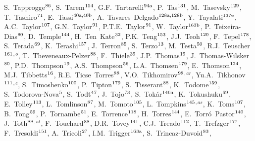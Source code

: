 \begin{flushleft}
S.~Tapprogge$^\textrm{\scriptsize 86}$,
S.~Tarem$^\textrm{\scriptsize 154}$,
G.F.~Tartarelli$^\textrm{\scriptsize 94a}$,
P.~Tas$^\textrm{\scriptsize 131}$,
M.~Tasevsky$^\textrm{\scriptsize 129}$,
T.~Tashiro$^\textrm{\scriptsize 71}$,
E.~Tassi$^\textrm{\scriptsize 40a,40b}$,
A.~Tavares~Delgado$^\textrm{\scriptsize 128a,128b}$,
Y.~Tayalati$^\textrm{\scriptsize 137e}$,
A.C.~Taylor$^\textrm{\scriptsize 107}$,
G.N.~Taylor$^\textrm{\scriptsize 91}$,
P.T.E.~Taylor$^\textrm{\scriptsize 91}$,
W.~Taylor$^\textrm{\scriptsize 163b}$,
P.~Teixeira-Dias$^\textrm{\scriptsize 80}$,
D.~Temple$^\textrm{\scriptsize 144}$,
H.~Ten~Kate$^\textrm{\scriptsize 32}$,
P.K.~Teng$^\textrm{\scriptsize 153}$,
J.J.~Teoh$^\textrm{\scriptsize 120}$,
F.~Tepel$^\textrm{\scriptsize 178}$,
S.~Terada$^\textrm{\scriptsize 69}$,
K.~Terashi$^\textrm{\scriptsize 157}$,
J.~Terron$^\textrm{\scriptsize 85}$,
S.~Terzo$^\textrm{\scriptsize 13}$,
M.~Testa$^\textrm{\scriptsize 50}$,
R.J.~Teuscher$^\textrm{\scriptsize 161}$$^{,o}$,
T.~Theveneaux-Pelzer$^\textrm{\scriptsize 88}$,
F.~Thiele$^\textrm{\scriptsize 39}$,
J.P.~Thomas$^\textrm{\scriptsize 19}$,
J.~Thomas-Wilsker$^\textrm{\scriptsize 80}$,
P.D.~Thompson$^\textrm{\scriptsize 19}$,
A.S.~Thompson$^\textrm{\scriptsize 56}$,
L.A.~Thomsen$^\textrm{\scriptsize 179}$,
E.~Thomson$^\textrm{\scriptsize 124}$,
M.J.~Tibbetts$^\textrm{\scriptsize 16}$,
R.E.~Ticse~Torres$^\textrm{\scriptsize 88}$,
V.O.~Tikhomirov$^\textrm{\scriptsize 98}$$^{,ar}$,
Yu.A.~Tikhonov$^\textrm{\scriptsize 111}$$^{,c}$,
S.~Timoshenko$^\textrm{\scriptsize 100}$,
P.~Tipton$^\textrm{\scriptsize 179}$,
S.~Tisserant$^\textrm{\scriptsize 88}$,
K.~Todome$^\textrm{\scriptsize 159}$,
S.~Todorova-Nova$^\textrm{\scriptsize 5}$,
S.~Todt$^\textrm{\scriptsize 47}$,
J.~Tojo$^\textrm{\scriptsize 73}$,
S.~Tok\'ar$^\textrm{\scriptsize 146a}$,
K.~Tokushuku$^\textrm{\scriptsize 69}$,
E.~Tolley$^\textrm{\scriptsize 113}$,
L.~Tomlinson$^\textrm{\scriptsize 87}$,
M.~Tomoto$^\textrm{\scriptsize 105}$,
L.~Tompkins$^\textrm{\scriptsize 145}$$^{,as}$,
K.~Toms$^\textrm{\scriptsize 107}$,
B.~Tong$^\textrm{\scriptsize 59}$,
P.~Tornambe$^\textrm{\scriptsize 51}$,
E.~Torrence$^\textrm{\scriptsize 118}$,
H.~Torres$^\textrm{\scriptsize 144}$,
E.~Torr\'o~Pastor$^\textrm{\scriptsize 140}$,
J.~Toth$^\textrm{\scriptsize 88}$$^{,at}$,
F.~Touchard$^\textrm{\scriptsize 88}$,
D.R.~Tovey$^\textrm{\scriptsize 141}$,
C.J.~Treado$^\textrm{\scriptsize 112}$,
T.~Trefzger$^\textrm{\scriptsize 177}$,
F.~Tresoldi$^\textrm{\scriptsize 151}$,
A.~Tricoli$^\textrm{\scriptsize 27}$,
I.M.~Trigger$^\textrm{\scriptsize 163a}$,
S.~Trincaz-Duvoid$^\textrm{\scriptsize 83}$,
$$
\end{flushleft}
